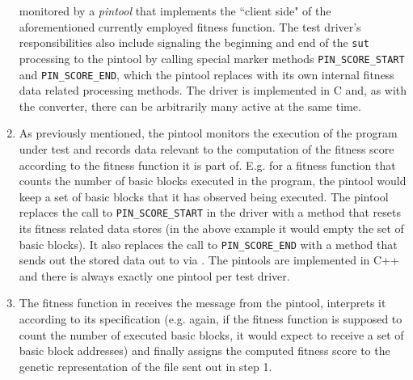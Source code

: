 \begin{enumerate}
  monitored by a \emph{pintool} that implements the ``client side" of the aforementioned currently 
  employed fitness function. The test driver's responsibilities also include signaling the beginning and end 
  of the \texttt{sut} processing to the pintool by calling special marker methods \texttt{PIN\_SCORE\_START} and
  \texttt{PIN\_SCORE\_END}, which the pintool replaces with its own internal fitness data related processing methods. 
  The driver is implemented in {\small C} and, as with the converter, there can be arbitrarily many active at the same time.
  \item As previously mentioned, the pintool monitors the execution of the program under test and records
  data relevant to the computation of the fitness score according to the fitness function it is part of.
  E.g. for a fitness function that counts the number of basic blocks executed in the program, the pintool 
  would keep a set of basic blocks that it has observed being executed. The pintool replaces the call to 
  \texttt{PIN\_SCORE\_START} in the driver with a method that resets its fitness related data stores (in the 
  above example it would empty the set of basic blocks). It also replaces the call to \texttt{PIN\_SCORE\_END} 
  with a method that sends out the stored data out to \xmlmate via \zmq. The pintools are implemented in {\small C++} 
  and there is always exactly one pintool per test driver.
  \item The fitness function in \xmlmate receives the message from the pintool, interprets it according to 
  its specification (e.g. again, if the fitness function is supposed to count the number of executed basic blocks, 
  it would expect to receive a set of basic block addresses) and finally assigns the computed fitness score to 
  the genetic representation of the \xml file sent out in step 1.
\end{enumerate}
